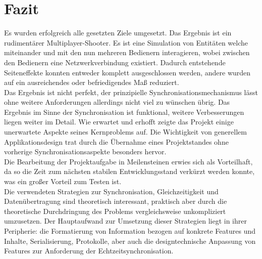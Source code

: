 \section{Fazit}
Es wurden erfolgreich alle gesetzten Ziele umgesetzt. Das Ergebnis ist ein rudimentärer Multiplayer-Shooter. Es ist eine Simulation von Entitäten welche miteinander und mit den nun mehreren Bedienern interagieren, wobei zwischen den Bedienern eine Netzwerkverbindung existiert. Dadurch entstehende Seiteneffekte konnten entweder komplett ausgeschlossen werden, andere wurden auf ein ausreichendes oder befriedigendes Maß reduziert.\\
Das Ergebnis ist nicht perfekt, der prinzipielle Synchronisationsmechanismus lässt ohne weitere Anforderungen allerdings nicht viel zu wünschen übrig. Das Ergebnis im Sinne der Synchronisation ist funktional, weitere Verbesserungen liegen weiter im Detail.
Wie erwartet und erhofft zeigte das Projekt einige unerwartete Aspekte seines Kernproblems auf. 
Die Wichtigkeit von generellem Applikationsdesign trat durch die Übernahme eines Projektstandes ohne vorherige Synchronisationsaspekte besonders hervor.\\
Die Bearbeitung der Projektaufgabe in Meilensteinen erwies sich als Vorteilhaft, da so die Zeit zum nächsten stabilen Entwicklungsstand verkürzt werden konnte, was ein großer Vorteil zum Testen ist.\\
Die verwendeten Strategien zur Synchronisation, Gleichzeitigkeit und Datenübertragung sind theoretisch interessant, praktisch aber durch die theoretische Durchdringung des Problems vergleichsweise unkompliziert umzusetzen. Der Hauptaufwand zur Umsetzung dieser Strategien liegt in ihrer Peripherie: die Formatierung von Information bezogen auf konkrete Features und Inhalte, Serialisierung, Protokolle, aber auch die designtechnische Anpassung von Features zur Anforderung der Echtzeitsynchronisation. 